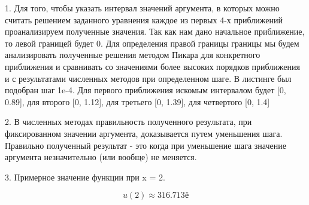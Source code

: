 \documentclass[12pt]{report}
\begin{document}

1. Для того, чтобы указать интервал значений аргумента, 
в которых можно считать решением заданного
уравнения каждое из первых 4-х приближений проанализируем
полученные значения.
Так как нам дано начальное приближение, то левой границей будет 0.
Для определения правой границы границы мы будем анализировать полученные
решения методом Пикара для конкретного приближения и сравнивать со значениями 
более высоких порядков приближения и с результатами численных методов при 
определенном шаге. В листинге был подобран шаг 1e-4.
Для первого приближения искомым интервалом будет [0, 0.89], 
для второго [0, 1.12], для третьего  [0, 1.39], для четвертого [0, 1.4]


2. В численных методах правильность полученного результата, при 
фиксированном значении аргумента, доказывается путем уменьшения шага.
Правильно полученный результат - это когда при уменьшение 
шага значение аргумента незначительно (или вообще) не меняется.

3. Примерное значение функции при x = 2.


\begin{equation}
	u(2) \approx 316.713
	\label{eq:ref4}ё
\end{equation}


	
	
	
\end{document}
